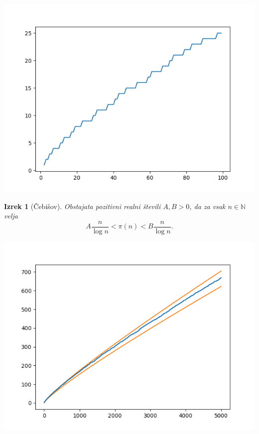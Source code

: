 \documentclass{beamer}
\newtheorem{izrek}{Izrek}
\def\N{\mathbb{N}}
\begin{document}

\begin{frame}
    \centering
    \includegraphics[height=0.95\textheight]{pi.png}
\end{frame}


\begin{frame}
    \begin{izrek}[Čebišov]
        Obstajata pozitivni realni števili $A, B > 0$, da za vsak $n \in \N$ velja $$A\frac{n}{\log{n}} < \pi(n) < B\frac{n}{\log{n}}.$$
    \end{izrek}
\end{frame}


\begin{frame}
    \centering
    \includegraphics[height=0.95\textheight]{cebisov.png}
\end{frame}
\end{document}
